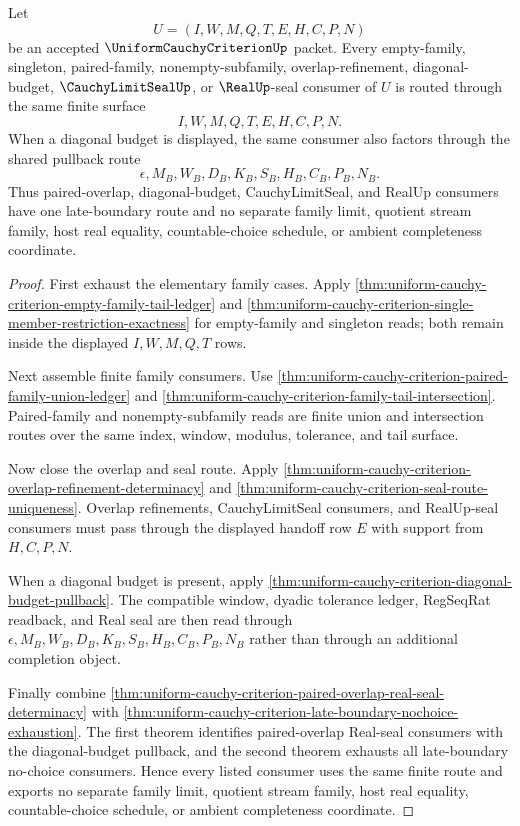 \begin{theorem}
\label{thm:uniform-cauchy-criterion-late-overlap-route-exhaustion}
Let
$$
U=(I,W,M,Q,T,E,H,C,P,N)
$$
be an accepted $\UniformCauchyCriterionUp$ packet. Every empty-family, singleton, paired-family, nonempty-subfamily, overlap-refinement, diagonal-budget, $\CauchyLimitSealUp$, or $\RealUp$-seal consumer of $U$ is routed through the same finite surface
$$
I,W,M,Q,T,E,H,C,P,N.
$$
When a diagonal budget is displayed, the same consumer also factors through the shared pullback route
$$
\epsilon,M_B,W_B,D_B,K_B,S_B,H_B,C_B,P_B,N_B.
$$
Thus paired-overlap, diagonal-budget, CauchyLimitSeal, and RealUp consumers have one late-boundary route and no separate family limit, quotient stream family, host real equality, countable-choice schedule, or ambient completeness coordinate.
\end{theorem}
\begin{proof}
First exhaust the elementary family cases. Apply \autoref{thm:uniform-cauchy-criterion-empty-family-tail-ledger} and \autoref{thm:uniform-cauchy-criterion-single-member-restriction-exactness} for empty-family and singleton reads; both remain inside the displayed $I,W,M,Q,T$ rows.

Next assemble finite family consumers. Use \autoref{thm:uniform-cauchy-criterion-paired-family-union-ledger} and \autoref{thm:uniform-cauchy-criterion-family-tail-intersection}. Paired-family and nonempty-subfamily reads are finite union and intersection routes over the same index, window, modulus, tolerance, and tail surface.

Now close the overlap and seal route. Apply \autoref{thm:uniform-cauchy-criterion-overlap-refinement-determinacy} and \autoref{thm:uniform-cauchy-criterion-seal-route-uniqueness}. Overlap refinements, CauchyLimitSeal consumers, and RealUp-seal consumers must pass through the displayed handoff row $E$ with support from $H,C,P,N$.

When a diagonal budget is present, apply \autoref{thm:uniform-cauchy-criterion-diagonal-budget-pullback}. The compatible window, dyadic tolerance ledger, RegSeqRat readback, and Real seal are then read through $\epsilon,M_B,W_B,D_B,K_B,S_B,H_B,C_B,P_B,N_B$ rather than through an additional completion object.

Finally combine \autoref{thm:uniform-cauchy-criterion-paired-overlap-real-seal-determinacy} with \autoref{thm:uniform-cauchy-criterion-late-boundary-nochoice-exhaustion}. The first theorem identifies paired-overlap Real-seal consumers with the diagonal-budget pullback, and the second theorem exhausts all late-boundary no-choice consumers. Hence every listed consumer uses the same finite route and exports no separate family limit, quotient stream family, host real equality, countable-choice schedule, or ambient completeness coordinate.
\end{proof}
